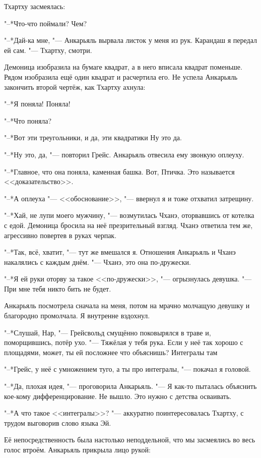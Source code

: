 \documentclass[a4paper,10pt,fleqn]{book}
\newcommand{\ldotst}{\so{...}\xspace}
\newcommand{\ldotse}{\so{!..}\xspace}
\begin{document}
Тхартху засмеялась:

"--*Что-что поймали?
Чем?

"--*Дай-ка мне, "--- Анкарьяль вырвала листок у меня из рук.
Карандаш я передал ей сам.
"--- Тхартху, смотри.

Демоница изобразила на бумаге квадрат, а в него вписала квадрат поменьше.
Рядом изобразила ещё один квадрат и расчертила его.
Не успела Анкарьяль закончить второй чертёж, как Тхартху ахнула:

"--*Я поняла!
Поняла!

"--*Что поняла?

"--*Вот эти треугольники, и да, эти квадратики\ldotse
Ну это\ldotst да.

"--*Ну это, да, "--- повторил Грейс.
Анкарьяль отвесила ему звонкую оплеуху.

"--*Главное, что она поняла, каменная башка.
Вот, Птичка.
Это называется <<доказательство>>.

"--*А оплеуха "--- <<обоснование>>, "--- ввернул я и тоже отхватил затрещину.

"--*Хай, не лупи моего мужчину, "--- возмутилась Чханэ, оторвавшись от котелка с едой.
Демоница бросила на неё презрительный взгляд.
Чханэ ответила тем же, агрессивно повертев в руках черпак.

"--*Так, всё, хватит, "--- тут же вмешался я.
Отношения Анкарьяль и Чханэ накалялись с каждым днём.
"--- Чханэ, это она по-дружески.

"--*Я ей руки оторву за такое <<по-дружески>>, "--- огрызнулась девушка.
"--- При мне тебя никто бить не будет.

Анкарьяль посмотрела сначала на меня, потом на мрачно молчащую девушку\ldotst и благородно промолчала.
Я внутренне вздохнул.

"--*Слушай, Нар, "--- Грейсвольд смущённо поковырялся в траве и, поморщившись, потёр ухо.
"--- Тяжёлая у тебя рука.
Если у неё так хорошо с площадями, может, ты ей посложнее что объяснишь?
Интегралы там\ldotst

"--*Грейс, у неё с умножением туго, а ты про интегралы, "--- покачал я головой.

"--*Да, плохая идея, "--- проговорила Анкарьяль.
"--- Я как-то пыталась объяснить кое-кому дифференцирование.
Не вышло.
Это нужно с детства осваивать.

"--*А что такое <<интегралы>>? "--- аккуратно поинтересовалась Тхартху, с трудом выговорив слово языка Эй.

Её непосредственность была настолько неподдельной, что мы засмеялись во весь голос втроём.
Анкарьяль прикрыла лицо рукой:
\end{document}
